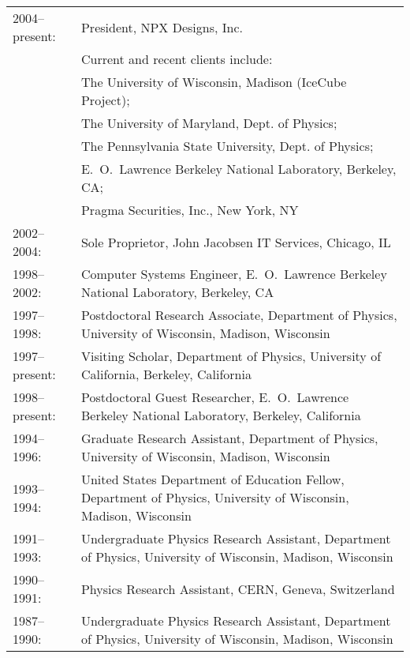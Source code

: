 \begin{tabular}[t]{lp{}}

2004--present: & President, NPX Designs, Inc.\\[0.1cm]
                            & Current and recent clients include: \\
                            & The University of Wisconsin, Madison (IceCube Project);\\
                            & The University of Maryland, Dept. of Physics;\\
                            & The Pennsylvania State University, Dept. of Physics;\\
                            & E.~O.~Lawrence Berkeley National Laboratory, Berkeley, CA;\\
                            & Pragma Securities, Inc., New York, NY\\[0.25cm]

2002--2004: & Sole Proprietor, John Jacobsen IT Services, Chicago, IL\\[0.25cm]

1998--2002: & Computer Systems Engineer, E.~O.~Lawrence Berkeley National Laboratory, Berkeley, CA\\[0.25cm]

1997--1998: & Postdoctoral Research Associate,
Department of Physics, University of Wisconsin, Madison,
Wisconsin\\[0.25cm]

1997--present: & Visiting Scholar,
Department of Physics, University of California, Berkeley,
California\\[0.25cm]

1998--present: & Postdoctoral Guest Researcher,
E.~O.~Lawrence Berkeley National Laboratory,
Berkeley, California\\[0.25cm]

1994--1996: & Graduate Research Assistant, 
Department of Physics, University of Wisconsin, Madison,
Wisconsin\\[0.25cm]

1993--1994: & United States Department of Education Fellow, Department
of Physics, University of Wisconsin, Madison,
Wisconsin\\[0.25cm]

1991--1993: & Undergraduate Physics Research Assistant, Department
of Physics, University of Wisconsin, Madison,
Wisconsin\\[0.25cm]

1990--1991: & Physics Research Assistant, CERN, Geneva, Switzerland
\\[0.25cm]

1987--1990: & Undergraduate Physics Research Assistant, Department
of Physics, University of Wisconsin, Madison,
Wisconsin\\[0.25cm]

\end{tabular}

